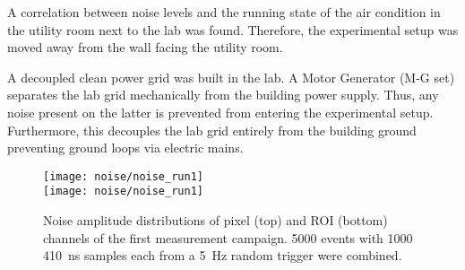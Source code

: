 A correlation between noise levels and the running state of the air condition in the utility room next to the lab was found.
Therefore, the experimental setup was moved away from the wall facing the utility room.

A decoupled clean power grid was built in the lab.
A Motor Generator (M-G set) separates the lab grid mechanically from the building power supply.
Thus, any noise present on the latter is prevented from entering the experimental setup.
Furthermore, this decouples the lab grid entirely from the building ground preventing ground loops via electric mains.

\begin{figure}[htb]
	\centering
	\texttt{[image: noise/noise\_run1]} \\
	\texttt{[image: noise/noise\_run1]}
	\caption{Noise amplitude distributions of pixel (top) and ROI (bottom) channels of the first measurement campaign.
	\num{5000} events with \num{1000} \SI{410}{\nano\second} samples each from a \SI{5}{\hertz} random trigger were combined.}
	\label{fig:electronics_noise-run1}
\end{figure}

